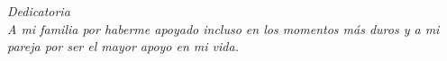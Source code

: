 
\thispagestyle{empty}
{}

\hfill
\vfill

\begin{flushright}
\itshape
Dedicatoria \\
A mi familia por haberme apoyado incluso en los momentos más duros y a mi pareja por ser el mayor apoyo en mi vida.
\end{flushright}

\vfill

\cleardoublepage
\endinput
